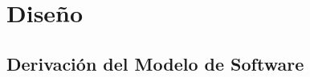 \documentclass[12pt]{article}
\makeatletter
\renewcommand\paragraph{\@startsection{paragraph}{4}{\z@}%
	{-2.5ex\@plus -1ex \@minus -.25ex}%
	{1.25ex \@plus .25ex}%
	{\normalfont\normalsize\bfseries}}
\makeatother
\begin{document}
\newpage



\newpage


\newpage


\newpage



\newpage
\section{Diseño}

\subsection{Derivación del Modelo de Software}
\end{document}
